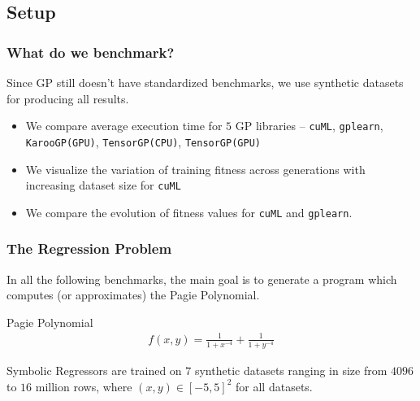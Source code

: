 \documentclass{beamer}
\begin{document}
\subsection{Setup}
\begin{frame}
  \frametitle{What do we benchmark?}
  Since GP still doesn't have standardized benchmarks, we use synthetic datasets for producing all results.
  \begin{itemize}
    \item We compare average execution time for $5$ GP libraries -- \texttt{cuML}, \texttt{gplearn}, \texttt{KarooGP(GPU)}, \texttt{TensorGP(CPU)}, \texttt{TensorGP(GPU)}
    \item We visualize the variation of training fitness across generations with increasing dataset size for \texttt{cuML}
    \item We compare the evolution of fitness values for \texttt{cuML} and \texttt{gplearn}. 
  \end{itemize}
\end{frame}

\begin{frame}
  \frametitle{The Regression Problem}
  In all the following benchmarks, the main goal is to generate a program which computes (or approximates) the Pagie Polynomial.
  \begin{block}{Pagie Polynomial}
    \begin{align*}
      f(x,y) = \frac{1}{1 + x^{-4}} + \frac{1}{1 + y^{-4}}
    \end{align*}  
  \end{block}
  Symbolic Regressors are trained on $7$ synthetic datasets ranging in size from $4096$ to $16$ million rows, where $(x,y) \in [-5,5]^2$ for all datasets.
\end{frame}
\end{document}

